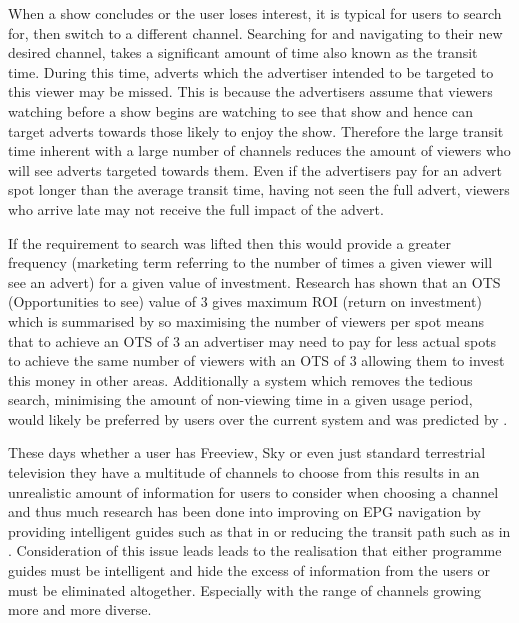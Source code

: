 When a show concludes or the user loses interest, it is typical for users to search for, then switch to a different channel. Searching for and navigating to their new desired channel, takes a significant amount of time also known as the transit time. During this time, adverts which the advertiser intended to be targeted to this viewer may be missed. This is because the advertisers assume that viewers watching before a show begins are watching to see that show and hence can target adverts towards those likely to enjoy the show. Therefore the large transit time inherent with a large number of channels reduces the amount of viewers who will see adverts targeted towards them. Even if the advertisers pay for an advert spot longer than the average transit time, having not seen the full advert, viewers who arrive late may not receive the full impact of the advert.

If the requirement to search was lifted then this would provide a greater frequency (marketing term referring to the number of times a given viewer will see an advert) for a given value of investment. Research has shown that an OTS (Opportunities to see) value of 3 gives maximum ROI (return on investment) which is summarised by \citet{OTS} so maximising the number of viewers per spot means that to achieve an OTS of 3 an advertiser may need to pay for less actual spots to achieve the same number of viewers with an OTS of 3 allowing them to invest this money in other areas. Additionally a system which removes the tedious search, minimising the amount of non-viewing time in a given usage period, would likely be preferred by users over the current system and was predicted by \citet{cisco10Reasons}.

These days whether a user has Freeview, Sky or even just standard terrestrial television they have a multitude of channels to choose from this results in an unrealistic amount of information for users to consider when choosing a channel and thus much research has been done into improving on EPG navigation by providing intelligent guides such as that in \citet{informationOverload} or reducing the transit path such as in \citet{personalisedEPG}. Consideration of this issue leads leads to the realisation that either programme guides must be intelligent and hide the excess of information from the users or must be eliminated altogether. Especially with the range of channels growing more and more diverse.


